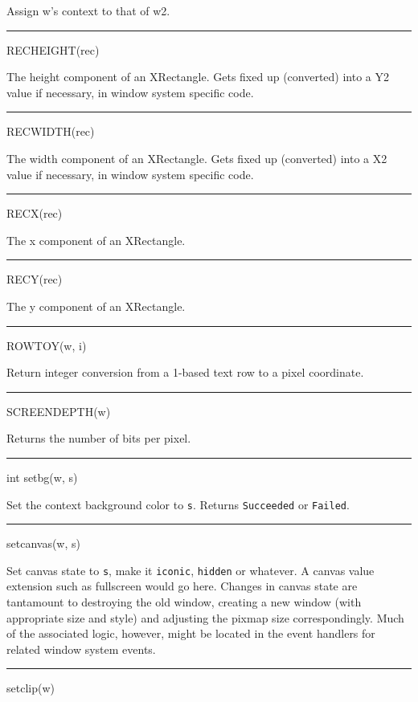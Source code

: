 Assign w's context to that of w2.


\bigskip\hrule\vspace{0.1cm}
\noindent
RECHEIGHT(rec)


The height component of an XRectangle. Gets {\textquotedbl}fixed
up{\textquotedbl} (converted) into a Y2 value if necessary, in window
system specific code.


\bigskip\hrule\vspace{0.1cm}
\noindent
RECWIDTH(rec)


The width component of an XRectangle. Gets {\textquotedbl}fixed
up{\textquotedbl} (converted) into a X2 value if necessary, in window
system specific code.


\bigskip\hrule\vspace{0.1cm}
\noindent
RECX(rec)


The x component of an XRectangle.


\bigskip\hrule\vspace{0.1cm}
\noindent
RECY(rec)


The y component of an XRectangle.


\bigskip\hrule\vspace{0.1cm}
\noindent
ROWTOY(w, i)


Return integer conversion from a 1-based text row to a pixel coordinate.


\bigskip\hrule\vspace{0.1cm}
\noindent
SCREENDEPTH(w)


Returns the number of bits per pixel.


\bigskip\hrule\vspace{0.1cm}
\noindent
int setbg(w, s)


Set the context background color to \texttt{s}. Returns
\texttt{Succeeded} or \texttt{Failed}.


\bigskip\hrule\vspace{0.1cm}
\noindent
setcanvas(w, s)


Set canvas state to \texttt{s}, make it
\texttt{{\textquotedbl}iconic{\textquotedbl}},
\texttt{{\textquotedbl}hidden{\textquotedbl}} or whatever. A canvas
value extension such as fullscreen would go here.  Changes in canvas
state are tantamount to destroying the old window, creating a new
window (with appropriate size and style) and adjusting the pixmap size
correspondingly. Much of the associated logic, however, might be
located in the event handlers for related window system events.


\bigskip\hrule\vspace{0.1cm}
\noindent
setclip(w)


